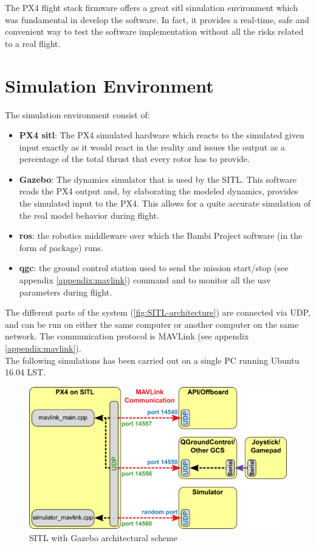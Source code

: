 The PX4 flight stack firmware offers a great \acrfull{sitl} simulation environment which was fundamental in develop the software. In fact, it provides a real-time, safe and convenient way to test the software implementation without all the risks related to a real flight. \\

\section{Simulation Environment} %
\label{sec:simulation_environment}
The simulation environment consist of:
\begin{itemize}
 	\item \textbf{PX4 \acrshort{sitl}}: The PX4 simulated hardware which reacts to the simulated given input exactly as it would react in the reality and issues the output as a percentage of the total thrust that every rotor has to provide.
 	\item \textbf{Gazebo}: The dynamics simulator that is used by the SITL. This software reads the PX4 output and, by elaborating the modeled dynamics, provides the simulated input to the PX4. This allows for a quite accurate simulation of the real model behavior during flight.
 	\item \textbf{\acrshort{ros}}: the robotics middleware over which the Bambi Project software (in the form of package) runs.
 	\item \textbf{\acrshort{qgc}}: the ground control station used to send the mission start/stop (see appendix \ref{appendix:mavlink}) command and to monitor all the \acrshort{uav} parameters during flight.
 \end{itemize}
 The different parts of the system (\autoref{fig:SITL-architecture}) are connected via UDP, and can be run on either the same computer or another computer on the same network. The communication protocol is MAVLink (see appendix \ref{appendix:mavlink}). \\
 The following simulations has been carried out on a single PC running Ubuntu 16.04 LST.
 \begin{figure}[ht]
    \centering
    \includegraphics[width=.7\textwidth]{figures/C4/Px4_sitl_overview}
    \caption{SITL with Gazebo architectural scheme}
    \label{fig:SITL-architecture}
\end{figure}

